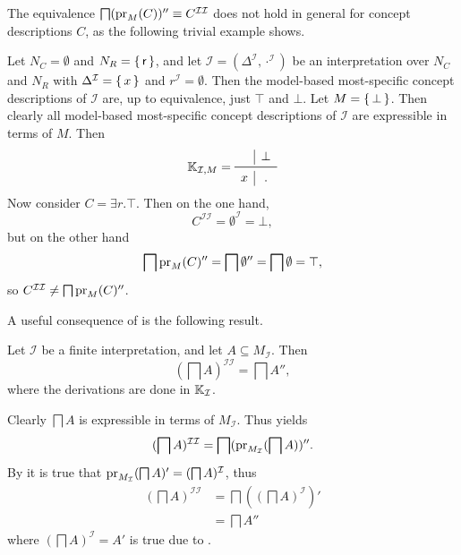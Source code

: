 The equivalence $\bigsqcap (\operatorname{pr}_M(C))'' \equiv C^{\mathcal{I}\mathcal{I}}$ does not hold
in general for concept descriptions $C$, as the following trivial example shows.

\begin{Example}
  \label{expl:counterexample}
  Let $N_C = \emptyset$ and $N_R = {\{\, \mathsf{r} \,\}}$, and let $\mathcal{I} =
  (\Delta^{\mathcal{I}}, \cdot^{\mathcal{I}})$ be an interpretation over $N_C$ and $N_R$
  with $\Delta^{\mathcal{I}} = {\{\, x \,\}}$ and $r^{\mathcal{I}} = \emptyset$.  Then the
  model-based most-specific concept descriptions of $\mathcal{I}$ are, up to equivalence,
  just $\top$ and $\bot$.  Let $M = {\{\, \bot \,\}}$.  Then clearly all model-based
  most-specific concept descriptions of $\mathcal{I}$ are expressible in terms of $M$.
  Then
  \begin{equation*}
    \con K_{\mathcal{I}, M} =
    \begin{array}{c|c}
      ~ & \bot \\\midrule
      x & . \\
    \end{array}
  \end{equation*}
  Now consider $C = \exists r. \top$.  Then on the one hand,
  \begin{equation*}
    C^{\mathcal{I}\mathcal{I}} = \emptyset^{\mathcal{I}} = \bot,
  \end{equation*}
  but on the other hand
  \begin{equation*}
    \bigsqcap \operatorname{pr}_M(C)'' = \bigsqcap \emptyset'' = \bigsqcap \emptyset = \top,
  \end{equation*}
  so $C^{\mathcal{I}\mathcal{I}} \neq \bigsqcap \operatorname{pr}_M(C)''$.
\end{Example}

A useful consequence of  is the following result.

\begin{Lemma}
  \label{lem:double-II-gets-double-prime}
  Let $\mathcal{I}$ be a finite interpretation, and let $A \subseteq M_{\mathcal{I}}$.  Then
  \begin{equation*}
    (\bigsqcap A)^{\mathcal{I}\mathcal{I}} = \bigsqcap A'',
  \end{equation*}
  where the derivations are done in ${\mathbb{K}}_{\mathcal{I}}$.
\end{Lemma}
\begin{Proof}
  Clearly $\bigsqcap A$ is expressible in terms of $M_{\mathcal{I}}$.  Thus
   yields
  \begin{equation*}
    (\bigsqcap A)^{\mathcal{I}\mathcal{I}} = \bigsqcap(\operatorname{pr}_{M_{\mathcal{I}}}(\bigsqcap A))''.
  \end{equation*}
  By  it is true that $\operatorname{pr}_{M_{\mathcal{I}}}(\bigsqcap A)'
  = (\bigsqcap A)^{\mathcal{I}}$, thus
  \begin{align*}
    (\bigsqcap A)^{\mathcal{I}\mathcal{I}}
    &= \bigsqcap ((\bigsqcap A)^{\mathcal{I}})'\\
    &= \bigsqcap A''
  \end{align*}
  where $(\bigsqcap A)^{\mathcal{I}} = A'$ is true due to
  .
\end{Proof}


